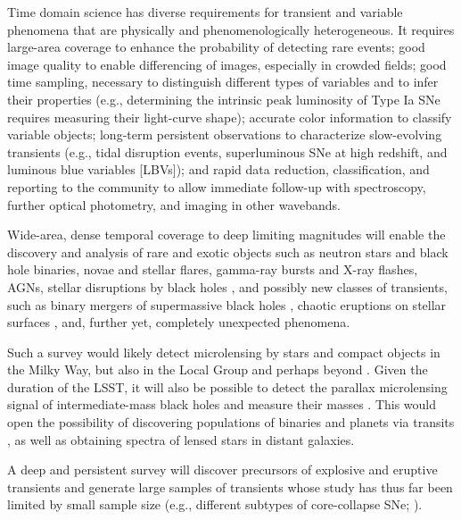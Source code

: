 Time domain science has diverse requirements for transient and
variable phenomena that are physically and phenomenologically
heterogeneous.  It requires large-area coverage to enhance the probability
of detecting rare events; good image quality to enable differencing of
images, especially in crowded fields; good time sampling, necessary to
distinguish different types of variables and to infer
their properties (e.g., determining the intrinsic peak luminosity of Type Ia
SNe requires measuring their light-curve shape); accurate
color information to classify variable objects;
long-term
persistent observations to characterize slow-evolving transients
(e.g., tidal disruption events, superluminous SNe at high
redshift, and luminous blue variables [LBVs]); and rapid data reduction,
classification, and reporting to the community to allow immediate
follow-up with spectroscopy, further optical photometry, and imaging in other
wavebands.

Wide-area, dense temporal coverage to deep limiting magnitudes will
enable the discovery and analysis of rare and exotic objects such as
neutron stars and black hole binaries, novae and stellar flares,
gamma-ray bursts and X-ray flashes, AGNs, stellar
disruptions by black holes \citep{2011Sci...333..203B,2012Natur.485..217G},
and possibly new classes of transients, such as binary mergers of
supermassive black holes \citep{2008ApJ...682..758S},
chaotic
eruptions on stellar surfaces \citep{2011ApJ...741...33A}, and, further yet, completely
unexpected phenomena.

Such a survey would likely detect microlensing by stars and compact objects in
the Milky Way, but also in the Local Group and perhaps beyond \citep{2008A&A...478..755D}.
Given the duration of the LSST, it will also be possible
to detect the parallax microlensing signal of intermediate-mass black holes and
measure their masses \citep{1992ApJ...392..442G}. This would open the possibility of
discovering populations of binaries and planets via transits
\citep[e.g.,][]{2006Natur.439..437B,2010arXiv1009.3048D,2013ApJ...768..129C,2014ApJ...780...54B},
as well as obtaining spectra of lensed stars in distant galaxies.

A deep and persistent survey will discover precursors of explosive and
eruptive transients and generate large samples of transients whose study
has thus far been limited by small sample size (e.g., different
subtypes of core-collapse SNe; \citealt{2014ApJS..213...19B}).

